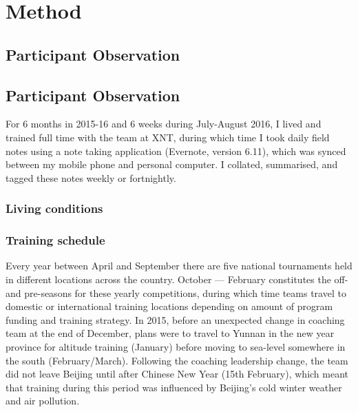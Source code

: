 


\section{Method}
  \subsection{Participant Observation}
  \subsection{Participant Observation}
  For 6 months in 2015-16 and 6 weeks during July-August 2016, I lived and trained full time with the team at XNT, during which time I took daily field notes using a note taking application (Evernote, version 6.11), which was synced between my mobile phone and personal computer. I collated, summarised, and tagged these notes weekly or fortnightly.

    \subsubsection{Living conditions}



    \subsubsection{Training schedule}
    Every year between April and September there are five national tournaments held in different locations across the country.  October –-- February constitutes the off- and pre-seasons for these yearly competitions, during which time teams travel to domestic or international training locations depending on amount of program funding and training strategy.  In 2015, before an unexpected change in coaching team at the end of December, plans were to travel to Yunnan in the new year province for altitude training (January) before moving to sea-level somewhere in the south (February/March).  Following the coaching leadership change, the team did not leave Beijing until after Chinese New Year (15th February), which meant that training during this period was influenced by Beijing's cold winter weather and air pollution.

